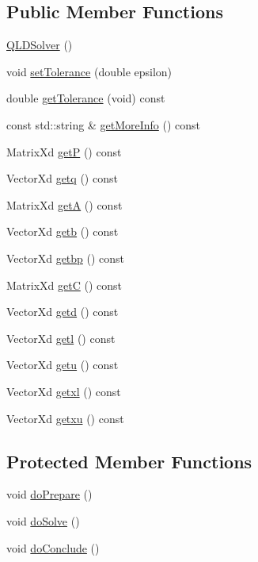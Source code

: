 \subsection*{Public Member Functions}
\begin{DoxyCompactItemize}
\item 
\hyperlink{classocra_1_1QLDSolver_a0071bb356541ccce1b5c5d3672baf72f}{Q\+L\+D\+Solver} ()
\item 
void \hyperlink{classocra_1_1QLDSolver_ad14fc2be094603279ccf271e48e5dbe7}{set\+Tolerance} (double epsilon)
\item 
double \hyperlink{classocra_1_1QLDSolver_ad851623ffbdc8c506d8d655e42b27210}{get\+Tolerance} (void) const 
\item 
const std\+::string \& \hyperlink{classocra_1_1QLDSolver_af60259457ee71861aa8f79ff287795bc}{get\+More\+Info} () const 
\item 
Matrix\+Xd \hyperlink{classocra_1_1QLDSolver_a978abcea8317dd5b89c17c4148716459}{getP} () const 
\item 
Vector\+Xd \hyperlink{classocra_1_1QLDSolver_aae1c09e4b4fd12abd51a894f4d7127e5}{getq} () const 
\item 
Matrix\+Xd \hyperlink{classocra_1_1QLDSolver_a79615410e051848b7d0390dabbd401e2}{getA} () const 
\item 
Vector\+Xd \hyperlink{classocra_1_1QLDSolver_af29ef1e517dcf650bd74d9bb1d5bcf91}{getb} () const 
\item 
Vector\+Xd \hyperlink{classocra_1_1QLDSolver_a04fba8ece4d4472ba91cbb2c70cc6ea4}{getbp} () const 
\item 
Matrix\+Xd \hyperlink{classocra_1_1QLDSolver_adbff517ba036d970f1f17841c8ec2eb3}{getC} () const 
\item 
Vector\+Xd \hyperlink{classocra_1_1QLDSolver_af26889ebb91704e6fa86949f3a3c6707}{getd} () const 
\item 
Vector\+Xd \hyperlink{classocra_1_1QLDSolver_a2cd34fc86b565c1d8e8729ea77906a5c}{getl} () const 
\item 
Vector\+Xd \hyperlink{classocra_1_1QLDSolver_a1cad131980fe635e6f11ab9ff12c38b3}{getu} () const 
\item 
Vector\+Xd \hyperlink{classocra_1_1QLDSolver_a1aa02e07a0a5701a7b293162f1b20a30}{getxl} () const 
\item 
Vector\+Xd \hyperlink{classocra_1_1QLDSolver_ab4829726ca88e6e2b59704813a75a2c5}{getxu} () const 
\end{DoxyCompactItemize}
\subsection*{Protected Member Functions}
\begin{DoxyCompactItemize}
\item 
void \hyperlink{classocra_1_1QLDSolver_ac590e2b4c851042177e8e4b84f946ced}{do\+Prepare} ()
\item 
void \hyperlink{classocra_1_1QLDSolver_acf5bca219fc8a5be246589f76097a6e0}{do\+Solve} ()
\item 
void \hyperlink{classocra_1_1QLDSolver_a1d6f5101e1cc2b6bc8256ac2d3e0d710}{do\+Conclude} ()
\end{DoxyCompactItemize}
